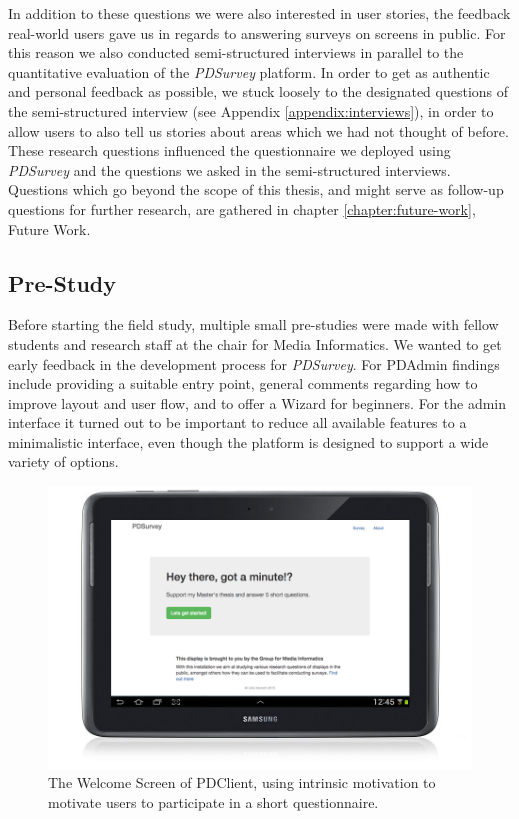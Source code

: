 	In addition to these questions we were also interested in user stories, the feedback real-world users gave us in regards to answering surveys on screens in public. For this reason we also conducted semi-structured interviews in parallel to the quantitative evaluation of the \textit{PDSurvey} platform. In order to get as authentic and personal feedback as possible, we stuck loosely to the designated questions of the semi-structured interview (see Appendix \ref{appendix:interviews}), in order to allow users to also tell us stories about areas which we had not thought of before.
	These research questions influenced the questionnaire we deployed using \textit{PDSurvey} and the questions we asked in the semi-structured interviews. Questions which go beyond the scope of this thesis, and might serve as follow-up questions for further research, are gathered in chapter \ref{chapter:future-work}, Future Work.




\clearpage
\subsection{Pre-Study}

	Before starting the field study, multiple small pre-studies were made with fellow students and research staff at the chair for Media Informatics. We wanted to get early feedback in the development process for \textit{PDSurvey}. 
	For PDAdmin findings include providing a suitable entry point, general comments regarding how to improve layout and user flow, and to offer a Wizard for beginners. For the admin interface it turned out to be important to reduce all available features to a minimalistic interface, even though the platform is designed to support a wide variety of options. 

	\begin{figure}
	    \begin{center}
	        \includegraphics[width=.7\columnwidth]{img/5_field-study/pdclient-startscreen.png}
	    \end{center}
	 \caption{The Welcome Screen of PDClient, using intrinsic motivation to motivate users to participate in a short questionnaire.}
	 \label{fig:5-pdclient-intro}
	\end{figure}


